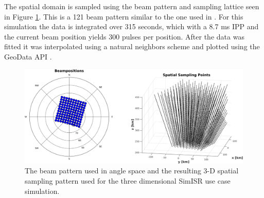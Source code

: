 \documentclass[draft,ras]{agutex}
\begin{document}
\begin{article}
The spatial domain is sampled using the beam pattern and sampling lattice seen in Figure \ref{fig:3dsampling}. This is a 121 beam pattern similar to the one used in \cite{Semeter:2008hs}. For this simulation the data is integrated over 315 seconds, which with a 8.7 ms IPP and the current beam position yields 300 pulses per position.
After the data was fitted it was interpolated using a natural neighbors scheme
and plotted using the GeoData API \citep{john_swoboda_2016_154536}.

\begin{figure}[!t]
\centering
\includegraphics[width=6in]{Sampling3d}
\caption{The beam pattern used in angle space and the resulting 3-D spatial sampling pattern used for the three dimensional SimISR use case simulation.}
\label{fig:3dsampling}
\end{figure}


\end{article}
\end{document}
